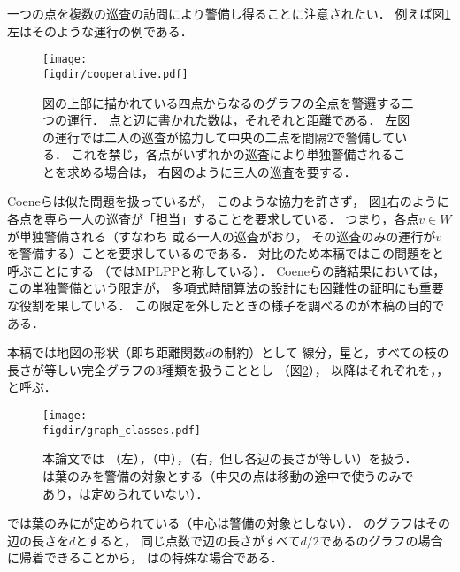 一つの点を複数の巡査の訪問により警備し得ることに注意されたい．
例えば図\ref{figure: cooperative}左はそのような運行の例である．
\begin{figure}
  \centering
  \texttt{[image: \\figdir/cooperative.pdf]}
  \caption{図の上部に描かれている四点からなる{\graphLine}のグラフの全点を警邏する二つの運行．
    点と辺に書かれた数は，それぞれ{\maxIdletime}と距離である．
    左図の運行では二人の巡査が協力して中央の二点を間隔$2$で警備している．
    これを禁じ，各点がいずれかの巡査により単独警備されることを求める場合は，
    右図のように三人の巡査を要する．}
  \label{figure: cooperative}
\end{figure}
Coeneら\cite{coene2011charlemagne}は似た問題を扱っているが，
このような協力を許さず，
図\ref{figure: cooperative}右のように
各点を専ら一人の巡査が「担当」することを要求している．
つまり，各点$v \in W$が単独警備される（すなわち
或る一人の巡査がおり，
その巡査のみの運行が$v$を警備する）ことを要求しているのである．
対比のため本稿ではこの問題を{\independentPatProb}と呼ぶことにする
（\cite{coene2011charlemagne}ではMPLPPと称している）．
Coeneら\cite{coene2011charlemagne}の諸結果においては，
この単独警備という限定が，
多項式時間算法の設計にも困難性の証明にも重要な役割を果している．
この限定を外したときの様子を調べるのが本稿の目的である．

本稿では地図の形状（即ち距離関数$d$の制約）として
線分，星と，すべての枝の長さが等しい完全グラフの3種類を扱うこととし
（図\ref{figure: graph_classes}），
以降はそれぞれを{\graphLine}，{\graphStar}，{\graphUnit}と呼ぶ．
\begin{figure}
  \centering
  \texttt{[image: \\figdir/graph\_classes.pdf]}
  \caption{本論文では
    {\graphLine}（左），{\graphStar}（中），{\graphUnit}（右，但し各辺の長さが等しい）を扱う．
    {\graphStar}は葉のみを警備の対象とする（中央の点は移動の途中で使うのみであり，{\maxIdletime}は定められていない）．}
  \label{figure: graph_classes}
\end{figure}
{\graphStar}では葉のみに{\maxIdletime}が定められている（中心は警備の対象としない）．
{\graphUnit}のグラフはその辺の長さを$d$とすると，
同じ点数で辺の長さがすべて$d/2$である{\graphStar}のグラフの場合に帰着できることから，
{\graphUnit}は{\graphStar}の特殊な場合である．


